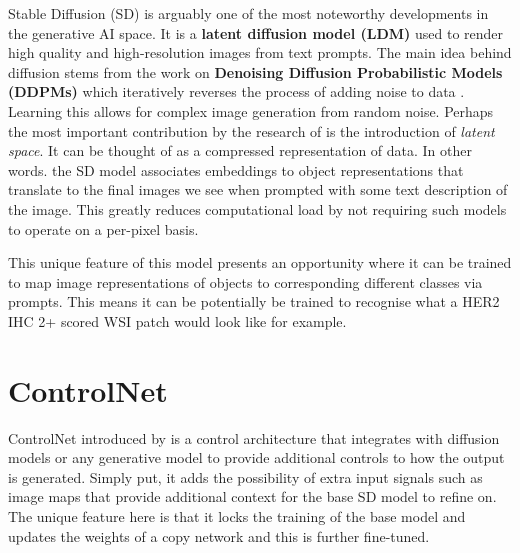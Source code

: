 Stable Diffusion (SD) is arguably one of the most noteworthy developments in the generative AI space. It is a  \textbf{latent diffusion model (LDM)} \parencite{Rombach2021High-ResolutionModels} used to render high quality and high-resolution images from text prompts. The main idea behind diffusion stems from the work on \textbf{Denoising Diffusion Probabilistic Models (DDPMs)} which iteratively reverses the process of adding noise to data \parencite{Ho2020DenoisingModels}. Learning this allows for complex image generation from random noise. Perhaps the most important contribution by the research of  \textcite{Rombach2021High-ResolutionModels} is the introduction of \textit{latent space}. It can be thought of as a compressed representation of data. In other words. the SD model associates embeddings to object representations that translate to the final images we see when prompted with some text description of the image. This greatly reduces computational load by not requiring such models to operate on a per-pixel basis.

This unique feature of this model presents an opportunity where it can be trained to map image representations of objects to corresponding different classes via prompts. This means it can be potentially be trained to recognise what a HER2 IHC 2+ scored WSI patch would look like for example. 

\section{ControlNet}

ControlNet introduced by \textcite{Zhang2023AddingModels} is a control architecture that integrates with diffusion models or any generative model to provide additional controls to how the output is generated. Simply put, it adds the possibility of extra input signals such as image maps that provide additional context for the base SD model to refine on. The unique feature here is that it locks the training of the base model and updates the weights of a copy network and this is further fine-tuned. 




